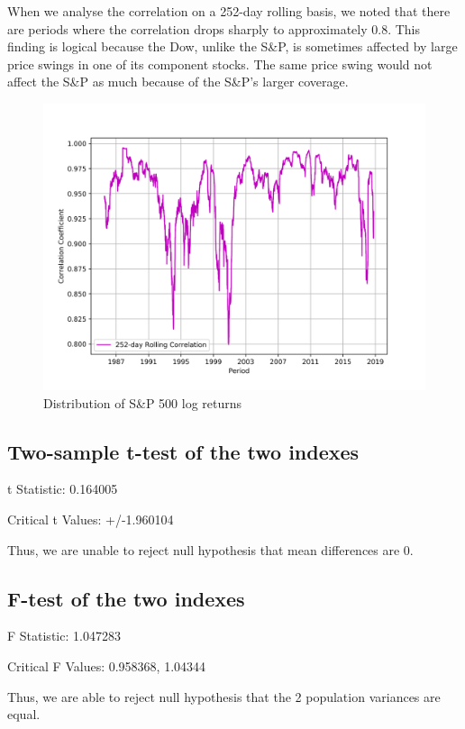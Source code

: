 \documentclass[a4paper]{article}
\begin{document}
	When we analyse the correlation on a 252-day rolling basis, we noted that there are periods where the correlation drops sharply to approximately 0.8. This finding is logical because the Dow, unlike the S\&P, is sometimes affected by large price swings in one of its component stocks. The same price swing would not affect the S\&P as much because of the S\&P’s larger coverage. 
	
	\begin{figure}[h!]
		\centering
		\includegraphics[width=0.8\linewidth]{correlation.png}
		\caption{Distribution of S\&P 500 log returns}
	\end{figure}
	
	\newpage
	\subsection{Two-sample t-test of the two indexes}
	\begin{flushleft}
		t Statistic: 0.164005
		
		Critical t Values: +/-1.960104
		
		Thus, we are unable to reject null hypothesis that mean differences are 0.
	\end{flushleft}
	
	\subsection{F-test of the two indexes}
	\begin{flushleft}
		F Statistic: 1.047283
		
		Critical F Values: 0.958368, 1.04344
		
		Thus, we are able to reject null hypothesis that the 2 population variances are equal.
	\end{flushleft}
	
	
\end{document}
